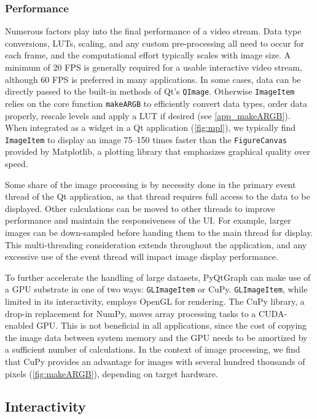 \subsubsection{Performance}

Numerous factors play into the final performance of a video stream. Data type conversions, LUTs, scaling, and any custom pre-processing all need to occur for each frame, and the computational effort typically scales with image size. A minimum of 20 FPS is generally required for a usable interactive video stream, although 60 FPS is preferred in many applications. In some cases, data can be directly passed to the built-in methods of Qt's \texttt{QImage}. Otherwise \texttt{ImageItem} relies on the core function \texttt{makeARGB} to efficiently convert data types, order data properly, rescale levels and apply a LUT if desired (see \autoref{app_makeARGB}). When integrated as a widget in a Qt application (\autoref{fig:mpl}), we typically find \texttt{ImageItem} to display an image 75--150 times faster than the \texttt{FigureCanvas} provided by Matplotlib, a plotting library that emphasizes graphical quality over speed.

Some share of the image processing is by necessity done in the primary event thread of the Qt application, as that thread requires full access to the data to be displayed. Other calculations can be moved to other threads to improve performance and maintain the responsiveness of the UI. For example, larger images can be down-sampled before handing them to the main thread for display. This multi-threading consideration extends throughout the application, and any excessive use of the event thread will impact image display performance.

\label{sec:cuda}
To further accelerate the handling of large datasets, PyQtGraph can make use of a GPU substrate in one of two ways: \texttt{GLImageItem} or CuPy. \texttt{GLImageItem}, while limited in its interactivity, employs OpenGL for rendering. The CuPy library, a drop-in replacement for NumPy, moves array processing tasks to a CUDA-enabled GPU. This is not beneficial in all applications, since the cost of copying the image data between system memory and the GPU needs to be amortized by a sufficient number of calculations. In the context of image processing, we find that CuPy provides an advantage for images with several hundred thousands of pixels (\autoref{fig:makeARGB}), depending on target hardware.

\subsection{Interactivity}

